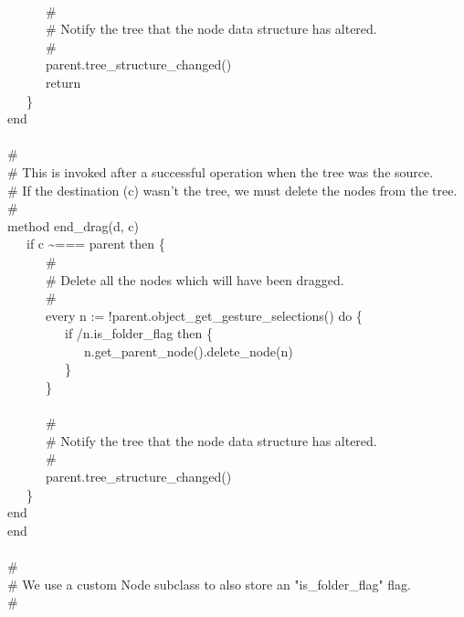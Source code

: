 {\ \\
\>   \ \ \ \ \ \ \# \\
\>   \ \ \ \ \ \ \# Notify the tree that the node data structure has altered. \\
\>   \ \ \ \ \ \ \# \\
\>   \ \ \ \ \ \ parent.tree\_structure\_changed() \\
\>   \ \ \ \ \ \ return \\
\>   \ \ \ \} \\
\>   end \\
\ \\
\>   \# \\
\>   \# This is invoked after a successful operation when the tree was the source.\\
\>   \# If the destination (c) wasn't the tree, we must delete the nodes from the tree. \\
\>   \# \\
\>   method end\_drag(d, c) \\
\>   \ \ \ if c \~{}=== parent then \{ \\
\>   \ \ \ \ \ \ \# \\
\>   \ \ \ \ \ \ \# Delete all the nodes which will have been dragged. \\
\>   \ \ \ \ \ \ \# \\
\>   \ \ \ \ \ \ every n := !parent.object\_get\_gesture\_selections()
do \{ \\
\>   \ \ \ \ \ \ \ \ \ if /n.is\_folder\_flag then \{ \\
\>   \ \ \ \ \ \ \ \ \ \ \ \ n.get\_parent\_node().delete\_node(n) \\
\>   \ \ \ \ \ \ \ \ \ \} \\
\>   \ \ \ \ \ \ \} \\
\ \\
\>   \ \ \ \ \ \ \# \\
\>   \ \ \ \ \ \ \# Notify the tree that the node data structure has altered. \\
\>   \ \ \ \ \ \ \# \\
\>   \ \ \ \ \ \ parent.tree\_structure\_changed() \\
\>   \ \ \ \} \\
\>   end \\
end \\
\ \\
\# \\
\# We use a custom Node subclass to also store an
"is\_folder\_flag" flag. \\
\# \\
}
